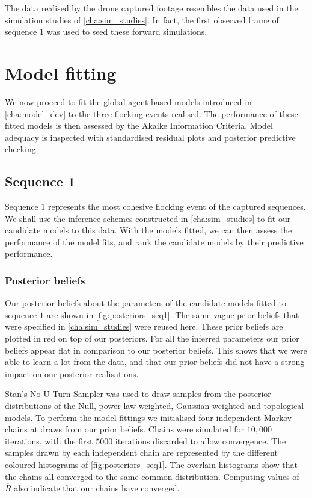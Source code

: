 The data realised by the drone captured footage resembles the data used in the
simulation studies of \cref{cha:sim_studies}. In fact, the first observed frame
of sequence $1$ was used to seed these forward simulations.
    
\section{Model fitting}

We now proceed to fit the global agent-based models introduced in
\cref{cha:model_dev} to the three flocking events realised. The performance of
these fitted models is then assessed by the Akaike Information Criteria. Model
adequacy is inspected with standardised residual plots and posterior predictive
checking.

\subsection{Sequence 1}

Sequence $1$ represents the most cohesive flocking event of the captured
sequences. We shall use the inference schemes constructed in
\cref{cha:sim_studies} to fit our candidate models to this data. With the
models fitted, we can then assess the performance of the model fits, and rank
the candidate models by their predictive performance.

\subsubsection{Posterior beliefs}

Our posterior beliefs about the parameters of the candidate models fitted to
sequence $1$ are shown in \cref{fig:posteriors_seq1}. The same vague prior
beliefs that were specified in \cref{cha:sim_studies} were reused here. These
prior beliefs are plotted in red on top of our posteriors. For all the inferred
parameters our prior beliefs appear flat in comparison to our posterior
beliefs. This shows that we were able to learn a lot from the data, and that
our prior beliefs did not have a strong impact on our posterior realisations.

Stan's No-U-Turn-Sampler was used to draw samples from the posterior
distributions of the Null, power-law weighted, Gaussian weighted and
topological models. To perform the model fittings we initialised four
independent Markov chains at draws from our prior beliefs. Chains were
simulated for $10,000$ iterations, with the first $5000$ iterations discarded
to allow convergence. The samples drawn by each independent chain are
represented by the different coloured histograms of \cref{fig:posteriors_seq1}.
The overlain histograms show that the chains all converged to the same common
distribution. Computing values of $\widehat{R}$ also indicate that our chains
have converged.

